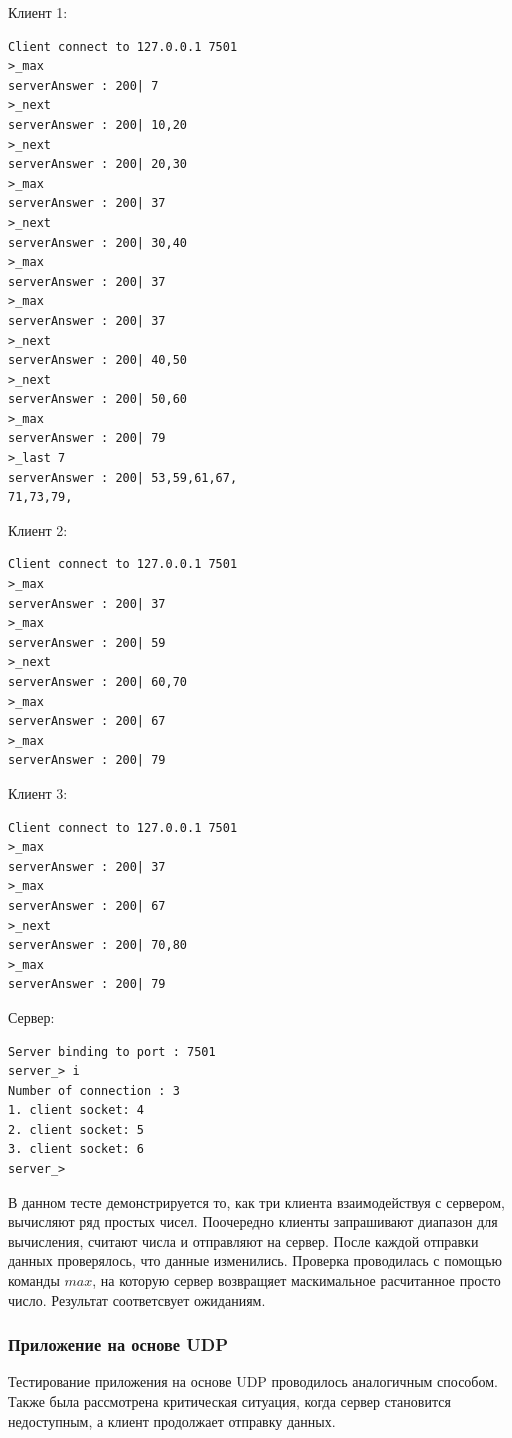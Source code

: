 \documentclass[a4paper,14pt]{extarticle}
\begin{document}
\begin{minipage}{0.5\textwidth}
  \begin{flushleft}
	Клиент 1:
     \begin{verbatim}
Client connect to 127.0.0.1 7501
>_max
serverAnswer : 200| 7
>_next
serverAnswer : 200| 10,20
>_next
serverAnswer : 200| 20,30
>_max
serverAnswer : 200| 37
>_next
serverAnswer : 200| 30,40
>_max
serverAnswer : 200| 37
>_max
serverAnswer : 200| 37
>_next
serverAnswer : 200| 40,50
>_next
serverAnswer : 200| 50,60
>_max
serverAnswer : 200| 79
>_last 7
serverAnswer : 200| 53,59,61,67,
71,73,79,
    \end{verbatim}
  \end{flushleft}
\end{minipage}
\begin{minipage}{0.5\textwidth}
  \begin{flushright}
	Клиент 2:
     \begin{verbatim}
Client connect to 127.0.0.1 7501
>_max
serverAnswer : 200| 37
>_max
serverAnswer : 200| 59
>_next
serverAnswer : 200| 60,70
>_max
serverAnswer : 200| 67
>_max
serverAnswer : 200| 79
     \end{verbatim}
     
     Клиент 3: 
     \begin{verbatim}
Client connect to 127.0.0.1 7501
>_max
serverAnswer : 200| 37
>_max
serverAnswer : 200| 67
>_next
serverAnswer : 200| 70,80
>_max
serverAnswer : 200| 79

     \end{verbatim}
  \end{flushright}
\end{minipage}

Сервер:
     \begin{verbatim}
Server binding to port : 7501
server_> i
Number of connection : 3
1. client socket: 4
2. client socket: 5
3. client socket: 6
server_> 
     \end{verbatim}
     
В данном тесте демонстрируется то, как три клиента взаимодействуя с сервером, вычисляют ряд простых чисел. Поочередно клиенты запрашивают диапазон для вычисления, считают числа и отправляют на сервер. После каждой отправки данных проверялось, что данные изменились. Проверка проводилась с помощью команды $max$, на которую сервер возвращяет маскимальное расчитанное просто число. Результат соответсвует ожиданиям.

\subsubsection{Приложение на основе UDP}
Тестирование приложения на основе UDP проводилось аналогичным способом. Также была рассмотрена критическая ситуация, когда сервер становится недоступным, а клиент продолжает отправку данных.
\end{document}
